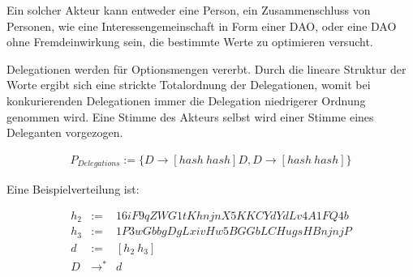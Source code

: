 \documentclass[a4paper,12pt]{report}
\begin{document}
Ein solcher Akteur kann entweder eine Person, ein Zusammenschluss von Personen, wie eine Interessengemeinschaft in Form einer DAO, oder eine DAO ohne Fremdeinwirkung sein, die bestimmte Werte zu optimieren versucht.

Delegationen werden für Optionsmengen vererbt. Durch die lineare Struktur der Worte ergibt sich eine strickte Totalordnung der Delegationen, womit bei konkurierenden Delegationen immer die Delegation niedrigerer Ordnung genommen wird. Eine Stimme des Akteurs selbst wird einer Stimme eines Deleganten vorgezogen.

\begin{eqnarray}
P_{Delegations} := \{D\rightarrow [hash\ hash]D,D\rightarrow [hash\ hash]\} 
\end{eqnarray}

Eine Beispielverteilung ist: 

\begin{eqnarray}
  h_2 &:=& 16iF9qZWG1tKhnjnX5KKCYdYdLv4A1FQ4b\\
  h_3 &:=& 1P3wGbbgDgLxivHw5BGGbLCHugsHBnjnjP\\
  d &:=& [h_2\ h_3] \\
  D &\rightarrow^*& d
\end{eqnarray}


% 
% 
% 
\end{document}
